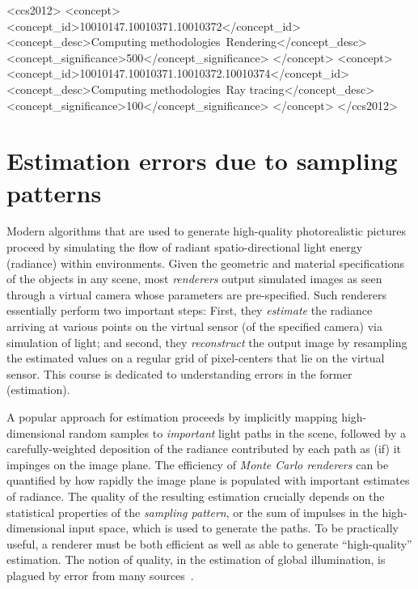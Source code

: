\documentclass{acmsiggraph}
\begin{document}
%
%
\begin{CCSXML}
<ccs2012>
<concept>
<concept_id>10010147.10010371.10010372</concept_id>
<concept_desc>Computing methodologies~Rendering</concept_desc>
<concept_significance>500</concept_significance>
</concept>
<concept>
<concept_id>10010147.10010371.10010372.10010374</concept_id>
<concept_desc>Computing methodologies~Ray tracing</concept_desc>
<concept_significance>100</concept_significance>
</concept>
</ccs2012>
\end{CCSXML}

%
%


\keywordlist

\conceptlist

\printcopyright

\section{Estimation errors due to sampling patterns}
Modern algorithms that are used to generate high-quality photorealistic pictures proceed by simulating the flow of radiant spatio-directional light energy (radiance) within environments. Given the geometric and material specifications of the objects in any scene, most \textit{renderers} output simulated images as seen through a virtual camera whose parameters are pre-specified. Such renderers essentially perform two important steps: First, they \textit{estimate} the radiance arriving at various points on the virtual sensor (of the specified camera) via simulation of light; and second, they \textit{reconstruct} the output image by resampling the estimated values on a regular grid of pixel-centers that lie on the virtual sensor. This course is dedicated to understanding errors in the former (estimation).

A popular approach for estimation proceeds by implicitly mapping high-dimensional random samples to \textit{important} light paths in the scene, followed by a carefully-weighted deposition of the radiance contributed by each path as (if) it impinges on the image plane. The efficiency of \textit {Monte Carlo renderers} can be quantified by how rapidly the image plane is populated with important estimates of radiance. The quality of the resulting estimation crucially depends on the statistical properties of the \textit {sampling pattern}, or the sum of impulses in the high-dimensional input space, which is used to generate the paths. To be practically useful, a renderer must be both efficient as well as able to generate ``high-quality'' estimation. The notion of quality, in the estimation of global illumination, is plagued by error from many sources~\cite{arvo1994framework}. 
\end{document}
